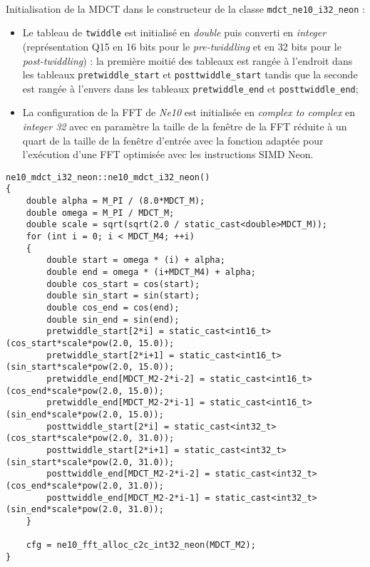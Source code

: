 \documentclass{article}
\begin{document}
\paragraph{}
Initialisation de la MDCT dans le constructeur de la classe \texttt{mdct\_ne10\_i32\_neon} :
\begin{itemize}
    \item Le tableau de \texttt{twiddle} est initialisé en \emph{double} puis converti en \emph{integer} (représentation Q15 en 16 bits pour le \emph{pre-twiddling} et en 32 bits pour le \emph{post-twiddling}) : la première moitié des tableaux est rangée à l'endroit dans les tableaux \texttt{pretwiddle\_start} et \texttt{posttwiddle\_start} tandis que la seconde est rangée à l'envers dans les tableaux \texttt{pretwiddle\_end} et \texttt{posttwiddle\_end};
    \item La configuration de la FFT de \emph{Ne10} est initialisée en \emph{complex to complex} en \emph{integer 32} avec en paramètre la taille de la fenêtre de la FFT réduite à un quart de la taille de la fenêtre d'entrée avec la fonction adaptée pour l'exécution d'une FFT optimisée avec les instructions SIMD Neon.
\end{itemize}
\lstset{language=C++}
\begin{lstlisting}
ne10_mdct_i32_neon::ne10_mdct_i32_neon()
{
    double alpha = M_PI / (8.0*MDCT_M);
    double omega = M_PI / MDCT_M;
    double scale = sqrt(sqrt(2.0 / static_cast<double>MDCT_M));
    for (int i = 0; i < MDCT_M4; ++i)
    {
        double start = omega * (i) + alpha;
        double end = omega * (i+MDCT_M4) + alpha;
        double cos_start = cos(start);
        double sin_start = sin(start);
        double cos_end = cos(end);
        double sin_end = sin(end);
        pretwiddle_start[2*i] = static_cast<int16_t>(cos_start*scale*pow(2.0, 15.0));
        pretwiddle_start[2*i+1] = static_cast<int16_t>(sin_start*scale*pow(2.0, 15.0));
        pretwiddle_end[MDCT_M2-2*i-2] = static_cast<int16_t>(cos_end*scale*pow(2.0, 15.0));
        pretwiddle_end[MDCT_M2-2*i-1] = static_cast<int16_t>(sin_end*scale*pow(2.0, 15.0));
        posttwiddle_start[2*i] = static_cast<int32_t>(cos_start*scale*pow(2.0, 31.0));
        posttwiddle_start[2*i+1] = static_cast<int32_t>(sin_start*scale*pow(2.0, 31.0));
        posttwiddle_end[MDCT_M2-2*i-2] = static_cast<int32_t>(cos_end*scale*pow(2.0, 31.0));
        posttwiddle_end[MDCT_M2-2*i-1] = static_cast<int32_t>(sin_end*scale*pow(2.0, 31.0));
    }

    cfg = ne10_fft_alloc_c2c_int32_neon(MDCT_M2);
}
\end{lstlisting}
\end{document}
